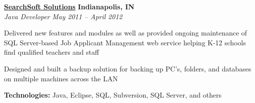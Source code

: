 %
    \headerrow
        {\textbf{\href{http://www.searchsoft.net/}{SearchSoft Solutions}}}
        {\textbf{Indianapolis, IN}}
    \\
    \headerrow
        {\emph{Java Developer}}
        {\emph{May 2011 -- April 2012}}
    \begin{itemize*}
        \item Delivered new features and modules as well as provided ongoing maintenance of SQL Server-based
                Job Applicant Management web service helping K-12 schools find qualified teachers and staff
        \item Designed and built a backup solution for backing up PC's, folders, and databases on multiple
                machines across the LAN
    \end{itemize*}

    \hspace{1.0em}
    \textbf{Technologies:} Java, Eclipse, SQL, Subversion, SQL Server, and others
